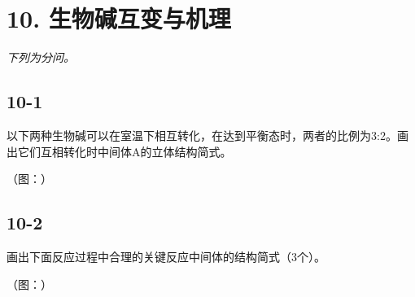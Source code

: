 \section*{10. 生物碱互变与机理}
\textit{下列为分问。}

\subsection*{10-1}
以下两种⽣物碱可以在室温下相互转化，在达到平衡态时，两者的⽐例为3:2。画出它们互相转化时中间体A的⽴体结构简式。

（图：）

\subsection*{10-2}
画出下⾯反应过程中合理的关键反应中间体的结构简式（3个）。

（图：）
